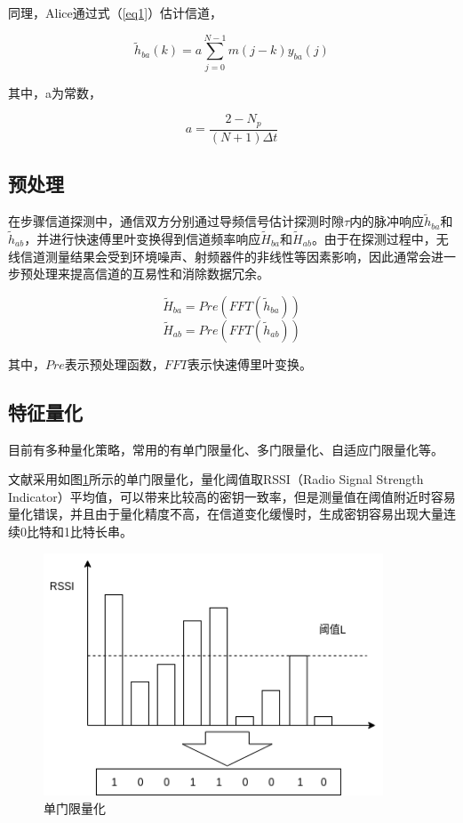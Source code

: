 \documentclass[master]{seuthesis} %
\begin{document}
\begin{Main}
同理，Alice通过式（\ref{eq1}）估计信道，
  
\begin{equation}
    \tilde{h}_{ba}(k) = a\sum_{j=0}^{N-1}m(j-k)y_{ba}(j)
\end{equation}
  
其中，a为常数，

\begin{equation}
    a = \frac{2-N_p}{(N + 1)\Delta t}
\end{equation}

\subsection{预处理}

在步骤信道探测中，通信双方分别通过导频信号估计探测时隙$\tau$内的脉冲响应$\tilde{h}_{ba}$和$\tilde{h}_{ab}$，并进行快速傅里叶变换得到信道频率响应$\tilde{H}_{ba}$和$\tilde{H}_{ab}$。由于在探测过程中，无线信道测量结果会受到环境噪声、射频器件的非线性等因素影响，因此通常会进一步预处理来提高信道的互易性和消除数据冗余。

\begin{equation}
    \tilde{H}_{ba} = Pre(FFT(\tilde{h}_{ba}))
\end{equation}
\begin{equation}
    \tilde{H}_{ab} = Pre(FFT(\tilde{h}_{ab}))
\end{equation}

其中，$Pre$表示预处理函数，$FFT$表示快速傅里叶变换。

\subsection{特征量化}

目前有多种量化策略，常用的有单门限量化、多门限量化、自适应门限量化等。

文献\citet{aono2005wireless}采用如图\ref{single_quantization}所示的单门限量化，量化阈值取RSSI（Radio Signal Strength Indicator）平均值，可以带来比较高的密钥一致率，但是测量值在阈值附近时容易量化错误，并且由于量化精度不高，在信道变化缓慢时，生成密钥容易出现大量连续0比特和1比特长串。

\begin{figure}[htbp!]
    \centering \includegraphics[width=0.9\textwidth]{images/single_quantization} 
    \caption{单门限量化}
    \label{single_quantization}
\end{figure}


\end{Main}
\end{document}
